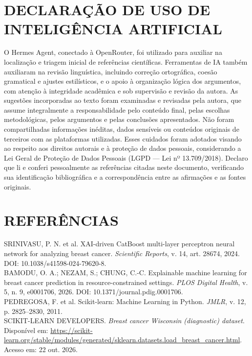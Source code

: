 \documentclass[article,11pt,oneside,a4paper,english,brazil,sumario=tradicional]{abntex2}
\begin{document}
\section{DECLARAÇÃO DE USO DE INTELIGÊNCIA ARTIFICIAL}
O Hermes Agent, conectado à OpenRouter, foi utilizado para auxiliar na localização e triagem inicial de referências científicas. Ferramentas de IA também auxiliaram na revisão linguística, incluindo correção ortográfica, coesão gramatical e ajustes estilísticos, e o apoio à organização lógica dos argumentos, com atenção à integridade acadêmica e sob supervisão e revisão da autora. As sugestões incorporadas ao texto foram examinadas e revisadas pela autora, que assume integralmente a responsabilidade pelo conteúdo final, pelas escolhas metodológicas, pelos argumentos e pelas conclusões apresentados. Não foram compartilhadas informações inéditas, dados sensíveis ou conteúdos originais de terceiros com as plataformas utilizadas. Esses cuidados foram adotados visando ao respeito aos direitos autorais e à proteção de dados pessoais, considerando a Lei Geral de Proteção de Dados Pessoais (LGPD --- Lei nº 13.709/2018). Declaro que li e conferi pessoalmente as referências citadas neste documento, verificando sua identificação bibliográfica e a correspondência entre as afirmações e as fontes originais. 

\clearpage
\section*{REFERÊNCIAS}
\begingroup\footnotesize\setlength{\parskip}{0pt}
\noindent SRINIVASU, P. N. et al. XAI-driven CatBoost multi-layer perceptron neural network for analyzing breast cancer. \textit{Scientific Reports}, v. 14, art. 28674, 2024. DOI: 10.1038/s41598-024-79620-8.\\
BAMODU, O. A.; NEZAM, S.; CHUNG, C.-C. Explainable machine learning for breast cancer prediction in resource-constrained settings. \textit{PLOS Digital Health}, v. 5, n. 9, e0001706, 2026. DOI: 10.1371/journal.pdig.0001706.\\
PEDREGOSA, F. et al. Scikit-learn: Machine Learning in Python. \textit{JMLR}, v. 12, p. 2825--2830, 2011.\\
SCIKIT-LEARN DEVELOPERS. \textit{Breast cancer Wisconsin (diagnostic) dataset}. Disponível em: \url{https://scikit-learn.org/stable/modules/generated/sklearn.datasets.load_breast_cancer.html}. Acesso em: 22 out. 2026.

\endgroup
\end{document}
